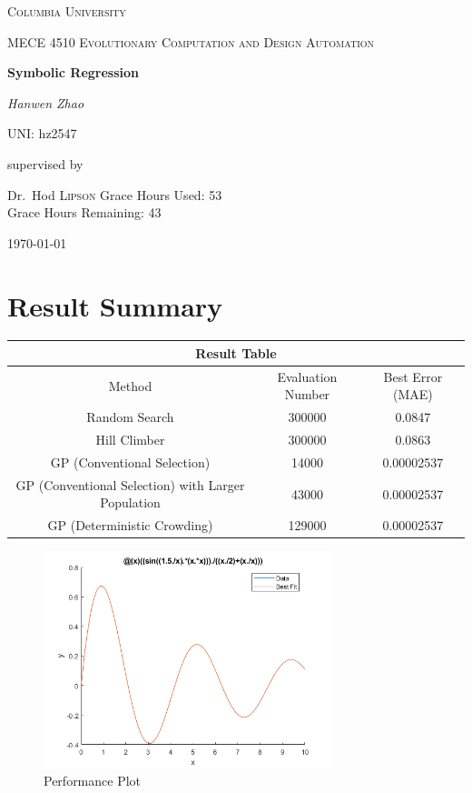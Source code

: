 \documentclass[12pt]{article}
\begin{document}
\begin{titlepage}
	\centering
	{\scshape\LARGE Columbia University \par}
	\vspace{1cm}
	{\scshape MECE 4510 Evolutionary Computation and Design Automation\par}
	\vspace{1.5cm}
	{\huge\bfseries Symbolic Regression\par}
	\vspace{2cm}
	{\Large\itshape Hanwen Zhao\par}
	{UNI: hz2547\par}
	\vfill
	supervised by\par
	Dr.~Hod \textsc{Lipson}
	\vfill
	Grace Hours Used: 53\\
	Grace Hours Remaining: 43 \\
	\vspace{2cm}
	{\large \today\par}
\end{titlepage}

\newpage
\section{Result Summary}
\begin{table}[!h]
\footnotesize
	\begin{center}
		\begin{tabular}{|c|c|c|}
			\hline
			\multicolumn{3}{|c|}{Result Table}\\
			\hline
			Method & Evaluation Number & Best Error (MAE)\\
			\hline
			Random Search & 300000 & 0.0847\\
			\hline
			Hill Climber & 300000 & 0.0863\\
			\hline
			GP (Conventional Selection) & 14000 & 0.00002537\\
			\hline
			GP (Conventional Selection) with Larger Population & 43000 & 0.00002537\\
			\hline
			GP (Deterministic Crowding) & 129000 & 0.00002537\\
			\hline
		\end{tabular}
	\end{center}
\end{table}

\begin{figure}[H]
	\centering
	\includegraphics[width=0.75\textwidth]{bestFit}
	\caption[]%
	{{\small Performance Plot}}    
\end{figure}
\end{document}
